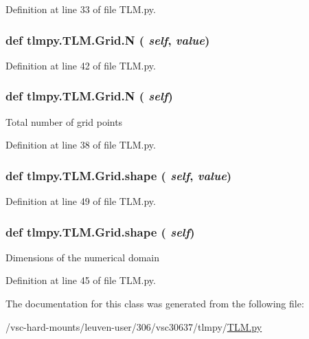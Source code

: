 Definition at line 33 of file TLM.py.\hypertarget{classtlmpy_1_1TLM_1_1Grid_a64b41637e043efec45a50bd8d059c1d8}{
\subsubsection[{N}]{\setlength{\rightskip}{0pt plus 5cm}def tlmpy.TLM.Grid.N ( {\em self}, \/   {\em value})}}
\label{classtlmpy_1_1TLM_1_1Grid_a64b41637e043efec45a50bd8d059c1d8}


Definition at line 42 of file TLM.py.\hypertarget{classtlmpy_1_1TLM_1_1Grid_a64b41637e043efec45a50bd8d059c1d8}{
\subsubsection[{N}]{\setlength{\rightskip}{0pt plus 5cm}def tlmpy.TLM.Grid.N ( {\em self})}}
\label{classtlmpy_1_1TLM_1_1Grid_a64b41637e043efec45a50bd8d059c1d8}
\begin{DoxyVerb}Total number of grid points\end{DoxyVerb}
 

Definition at line 38 of file TLM.py.\hypertarget{classtlmpy_1_1TLM_1_1Grid_ae142be9e5922e86de90f2e936b419e10}{
\subsubsection[{shape}]{\setlength{\rightskip}{0pt plus 5cm}def tlmpy.TLM.Grid.shape ( {\em self}, \/   {\em value})}}
\label{classtlmpy_1_1TLM_1_1Grid_ae142be9e5922e86de90f2e936b419e10}


Definition at line 49 of file TLM.py.\hypertarget{classtlmpy_1_1TLM_1_1Grid_ae142be9e5922e86de90f2e936b419e10}{
\subsubsection[{shape}]{\setlength{\rightskip}{0pt plus 5cm}def tlmpy.TLM.Grid.shape ( {\em self})}}
\label{classtlmpy_1_1TLM_1_1Grid_ae142be9e5922e86de90f2e936b419e10}
\begin{DoxyVerb}Dimensions of the numerical domain\end{DoxyVerb}
 

Definition at line 45 of file TLM.py.

The documentation for this class was generated from the following file:\begin{DoxyCompactItemize}
\item 
/vsc-\/hard-\/mounts/leuven-\/user/306/vsc30637/tlmpy/\hyperlink{TLM_8py}{TLM.py}\end{DoxyCompactItemize}
